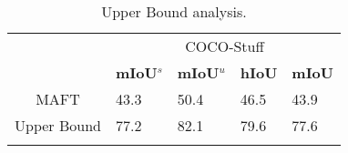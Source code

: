 \begin{table*}[ht]
\caption{Upper Bound analysis.}
\label{tab:appendix-upp}
\centering
    { 
    \renewcommand\arraystretch{1.1} %
    \small
    \begin{tabular}
    {l|llll}
    \Xhline{0.7px}
    \centering
    & \multicolumn{4}{c}{COCO-Stuff} \\
    & \textbf{mIoU$^s$} & \textbf{mIoU$^u$} & \textbf{hIoU} & \textbf{mIoU} \\
    \hline
    \multicolumn{1}{c|}{MAFT} & 43.3 &  50.4 &  46.5 &  43.9\\
    \multicolumn{1}{c|}{Upper Bound} & 77.2 &  82.1 &  79.6 &  77.6\\
    \Xhline{0.7px}
    \end{tabular}
    }
\end{table*}
